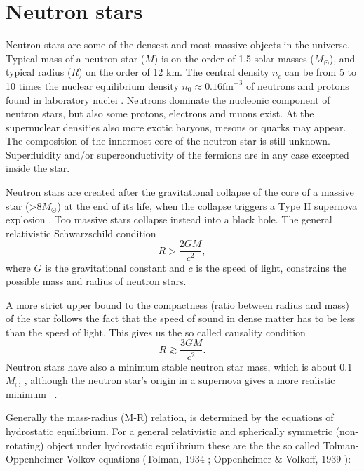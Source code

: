 \documentclass{wihuri}
\begin{document}
\section{Neutron stars}


Neutron stars are some of the densest and most massive objects in the
universe. Typical mass of a neutron star ($M$) is on the order of 1.5 solar masses ($M_{\odot}$), and typical radius ($R$) on the order of 12 km. The central density $n_{c}$ can be from 5 to 10 times the nuclear equilibrium density $n_{0} \approx 0.16 \mathrm{fm}^{-3}$ of neutrons and protons found in laboratory nuclei \cite{lattimer}. Neutrons dominate the nucleonic component of neutron stars, but also some protons, electrons and muons exist. At the supernuclear densities also more exotic baryons, mesons or quarks may appear. The composition of the innermost core of the neutron star is still unknown. Superfluidity and/or superconductivity of the fermions are in any case excepted inside the star. 

 
Neutron stars are created after the gravitational collapse of the core of a
massive star (>8$M_{\odot}$) at the end of its life, when the collapse triggers a Type II supernova explosion \cite{lattimer}. Too massive stars collapse instead into a black hole. The general relativistic Schwarzschild condition 
\begin{equation}
 R > \frac{2GM}{c^{2}},
 \end{equation} 
where $G$ is the gravitational constant and $c$ is the speed of light, constrains the possible mass and radius of neutron stars.

A more strict upper bound to the compactness (ratio between radius and mass) of the star follows
the fact \cite{rhoades} %
that the speed of sound in dense matter has to be less than the speed of light. This gives us the so called causality condition
\begin{equation}
 R \gtrsim \frac{3GM}{c^{2}}.
 \end{equation} 
Neutron stars have also a minimum stable neutron star mass, which is about 0.1 $M_{\odot}$ , although the neutron star’s origin in a supernova gives a more realistic minimum ~\cite{lattimer2013}.


Generally the mass-radius (M-R) relation, is determined by the equations of hydrostatic equilibrium. For a general relativistic and spherically symmetric (non-rotating) object under hydrostatic equilibrium these are the the so called Tolman-Oppenheimer-Volkov equations (Tolman,
1934 \cite{tolman}; Oppenheimer \& Volkoff, 1939 \cite{oppenheimer}):
\end{document}
